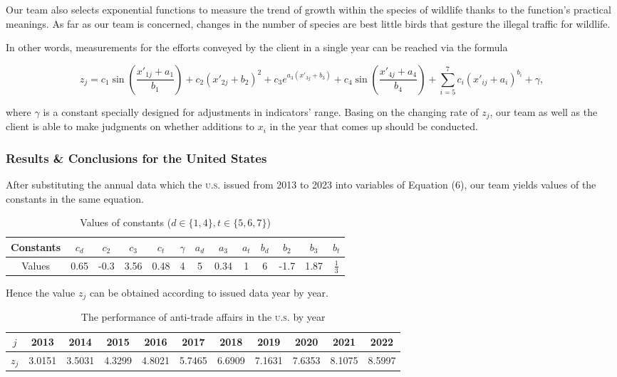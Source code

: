 \documentclass[12pt]{article}
\begin{document}
Our team also selects exponential functions to measure the trend of growth within the species of wildlife thanks to the function's practical meanings. As far as our team is concerned, changes in the number of species are best little birds that gesture the illegal traffic for wildlife.

In other words, measurements for the efforts conveyed by the client in a single year can be reached via the formula

\begin{equation}
	z_{j} = c_1 \sin(\frac{x'_{1j}+a_1}{b_1})+c_2(x'_{2j}+b_2)^2+c_3e^{a_3(x'_{3j}+b_3)}+c_4\sin (\frac{x'_{4j}+a_4}{b_4})+\sum_{i=5}^7c_i(x'_{ij}+a_i)^{b_i}+\gamma,
\end{equation}

where $\gamma$ is a constant specially designed for adjustments in indicators' range. Basing on the changing rate of $z_j$, our team as well as the client is able to make judgments on whether additions to $x_i$ in the year that comes up should be conducted.

\subsubsection{Results \& Conclusions for the United States}

After substituting the annual data which the \textsc{u.s.} issued from 2013 to 2023 into variables of Equation (6), our team yields values of the constants in the same equation.

\begin{table}[htbp]
\centering
	\begin{tabular}{c|cccccccccccc}
		Constants & $c_d$ & $c_2$ & $c_3$ & $c_t$ & $\gamma$ &$a_d$ & $a_3$ & $a_t$ & $b_d$ & $b_2$ & $b_3$ & $b_t$\\
		\hline
		Values & 0.65 & -0.3 & 3.56 & 0.48 & 4 & 5 & 0.34 & 1 & 6 & -1.7 & 1.87 & $\frac{1}{3}$
	\end{tabular}
\caption{Values of constants ($d\in\{1, 4\}, t\in\{5, 6, 7\}$)}
\end{table}

Hence the value $z_j$ can be obtained according to issued data year by year.
\begin{table}[htbp]
\centering
	\begin{tabular}{c|cccccccccc}
		$j$ & 2013 & 2014 & 2015 & 2016 & 2017 & 2018 & 2019 & 2020 & 2021 & 2022\\
		\hline
		$z_j$ & 3.0151 & 3.5031 & 4.3299 & 4.8021 & 5.7465 & 6.6909 & 7.1631 & 7.6353 & 8.1075 & 8.5997\\
	\end{tabular}
\caption{The performance of anti-trade affairs in the \textsc{u.s.} by year}
\end{table}
\end{document}
